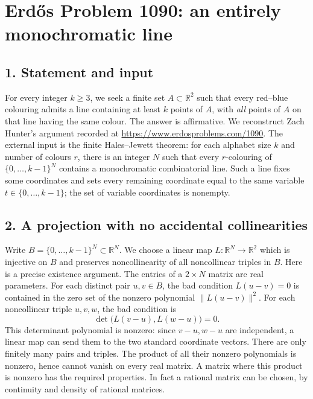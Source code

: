 \section*{Erd\H{o}s Problem 1090: an entirely monochromatic line}
\subsection*{1. Statement and input}
For every integer $k\ge3$, we seek a finite set $A\subset\mathbb R^2$ such that every red--blue colouring admits a line containing at least $k$ points of $A$, with \emph{all} points of $A$ on that line having the same colour.
The answer is affirmative. We reconstruct Zach Hunter's argument recorded at \url{https://www.erdosproblems.com/1090}. The external input is the finite Hales--Jewett theorem: for each alphabet size $k$ and number of colours $r$, there is an integer $N$ such that every $r$-colouring of $\{0,\ldots,k-1\}^N$ contains a monochromatic combinatorial line. Such a line fixes some coordinates and sets every remaining coordinate equal to the same variable $t\in\{0,\ldots,k-1\}$; the set of variable coordinates is nonempty.

\subsection*{2. A projection with no accidental collinearities}
Write $B=\{0,\ldots,k-1\}^N\subset\mathbb R^N$. We choose a linear map $L:\mathbb R^N\to\mathbb R^2$ which is injective on $B$ and preserves noncollinearity of all noncollinear triples in $B$.
Here is a precise existence argument. The entries of a $2\times N$ matrix are real parameters. For each distinct pair $u,v\in B$, the bad condition $L(u-v)=0$ is contained in the zero set of the nonzero polynomial $\|L(u-v)\|^2$. For each noncollinear triple $u,v,w$, the bad condition is
\[
 \det\bigl(L(v-u),L(w-u)\bigr)=0.
\]
This determinant polynomial is nonzero: since $v-u,w-u$ are independent, a linear map can send them to the two standard coordinate vectors. There are only finitely many pairs and triples. The product of all their nonzero polynomials is nonzero, hence cannot vanish on every real matrix. A matrix where this product is nonzero has the required properties. In fact a rational matrix can be chosen, by continuity and density of rational matrices.

